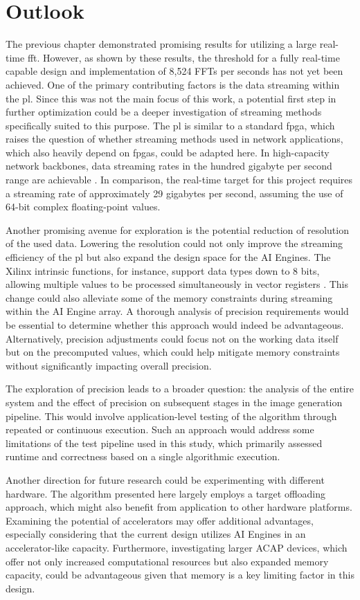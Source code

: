 \section{Outlook}\label{sec:future}
The previous chapter demonstrated promising results for utilizing a large real-time \ac{fft}. However, as shown by these results, the threshold for a fully real-time capable design and implementation of 8,524 FFTs per seconds has not yet been achieved. One of the primary contributing factors is the data streaming within the \ac{pl}. Since this was not the main focus of this work, a potential first step in further optimization could be a deeper investigation of streaming methods specifically suited to this purpose. The \ac{pl} is similar to a standard \ac{fpga}, which raises the question of whether streaming methods used in network applications, which also heavily depend on \ac{fpga}s, could be adapted here. In high-capacity network backbones, data streaming rates in the hundred gigabyte per second range are achievable \cite{jankovic_high-capacity_2020}. In comparison, the real-time target for this project requires a streaming rate of approximately 29 gigabytes per second, assuming the use of 64-bit complex floating-point values.\par
Another promising avenue for exploration is the potential reduction of resolution of the used data. Lowering the resolution could not only improve the streaming efficiency of the \ac{pl} but also expand the design space for the AI Engines. The Xilinx intrinsic functions, for instance, support data types down to 8 bits, allowing multiple values to be processed simultaneously in vector registers \cite{henry_leveraging_2019}. This change could also alleviate some of the memory constraints during streaming within the AI Engine array. A thorough analysis of precision requirements would be essential to determine whether this approach would indeed be advantageous. Alternatively, precision adjustments could focus not on the working data itself but on the precomputed values, which could help mitigate memory constraints without significantly impacting overall precision.\par
The exploration of precision leads to a broader question: the analysis of the entire system and the effect of precision on subsequent stages in the image generation pipeline. This would involve application-level testing of the algorithm through repeated or continuous execution. Such an approach would address some limitations of the test pipeline used in this study, which primarily assessed runtime and correctness based on a single algorithmic execution.\par
Another direction for future research could be experimenting with different hardware. The algorithm presented here largely employs a target offloading approach, which might also benefit from application to other hardware platforms. Examining the potential of accelerators may offer additional advantages, especially considering that the current design utilizes AI Engines in an accelerator-like capacity. Furthermore, investigating larger ACAP devices, which offer not only increased computational resources but also expanded memory capacity, could be advantageous given that memory is a key limiting factor in this design.